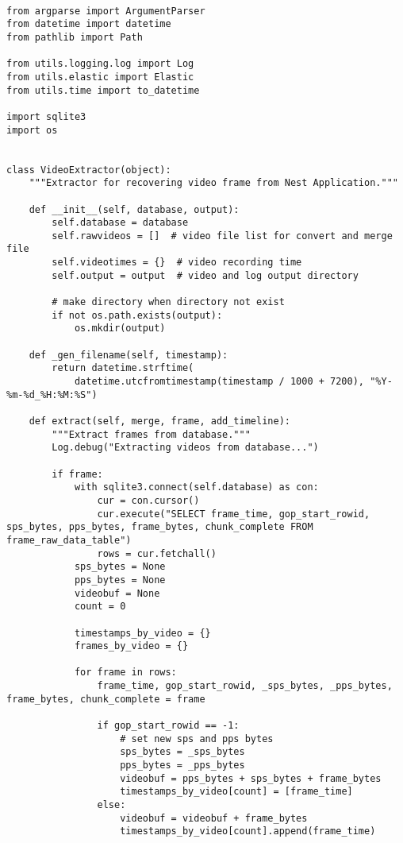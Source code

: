 \documentclass{easychair}
\begin{document}
\lstset{language=Python}
\lstset{frame=lines}
\lstset{basicstyle=\footnotesize}
\begin{lstlisting}

from argparse import ArgumentParser
from datetime import datetime
from pathlib import Path

from utils.logging.log import Log
from utils.elastic import Elastic
from utils.time import to_datetime

import sqlite3
import os


class VideoExtractor(object):
    """Extractor for recovering video frame from Nest Application."""

    def __init__(self, database, output):
        self.database = database
        self.rawvideos = []  # video file list for convert and merge file
        self.videotimes = {}  # video recording time
        self.output = output  # video and log output directory

        # make directory when directory not exist
        if not os.path.exists(output):
            os.mkdir(output)

    def _gen_filename(self, timestamp):
        return datetime.strftime(
            datetime.utcfromtimestamp(timestamp / 1000 + 7200), "%Y-%m-%d_%H:%M:%S")

    def extract(self, merge, frame, add_timeline):
        """Extract frames from database."""
        Log.debug("Extracting videos from database...")

        if frame:
            with sqlite3.connect(self.database) as con:
                cur = con.cursor()
                cur.execute("SELECT frame_time, gop_start_rowid, sps_bytes, pps_bytes, frame_bytes, chunk_complete FROM frame_raw_data_table")
                rows = cur.fetchall()
            sps_bytes = None
            pps_bytes = None
            videobuf = None
            count = 0

            timestamps_by_video = {}
            frames_by_video = {}

            for frame in rows:
                frame_time, gop_start_rowid, _sps_bytes, _pps_bytes, frame_bytes, chunk_complete = frame

                if gop_start_rowid == -1:
                    # set new sps and pps bytes
                    sps_bytes = _sps_bytes
                    pps_bytes = _pps_bytes
                    videobuf = pps_bytes + sps_bytes + frame_bytes
                    timestamps_by_video[count] = [frame_time]
                else:
                    videobuf = videobuf + frame_bytes
                    timestamps_by_video[count].append(frame_time)


\end{lstlisting}
\end{document}
